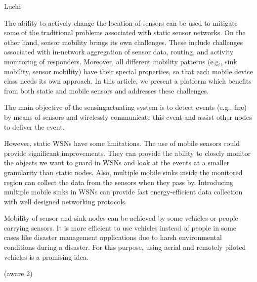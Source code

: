 Luchi







The ability to actively change the
location of sensors can be used to mitigate some
of the traditional problems associated with static
sensor networks. On the other hand, sensor
mobility brings its own challenges. These include
challenges associated with in-network aggregation
of sensor data, routing, and activity monitoring
of responders. Moreover, all different
mobility patterns (e.g., sink mobility, sensor
mobility) have their special properties, so that
each mobile device class needs its own approach.
In this article, we present a platform which benefits
from both static and mobile sensors and
addresses these challenges. 

The main objective of the sensingactuating
system is to detect events (e.g., fire)
by means of sensors and wirelessly communicate
this event and assist other nodes to deliver
the event.

However, static WSNs have some limitations.
The use of mobile sensors could provide
significant improvements. They can provide the
ability to closely monitor the objects we want
to guard in WSNs and look at the events at a
smaller granularity than static nodes. Also,
multiple mobile sinks inside the monitored
region can collect the data from the sensors
when they pass by. Introducing multiple mobile
sinks in WSNs can provide fast energy-efficient
data collection with well designed networking
protocols.

Mobility of sensor and sink nodes can be
achieved by some vehicles or people carrying
sensors. It is more efficient to use vehicles
instead of people in some cases like disaster
management applications due to harsh environmental
conditions during a disaster. For this purpose,
using aerial and remotely piloted vehicles
is a promising idea.

(aware 2)